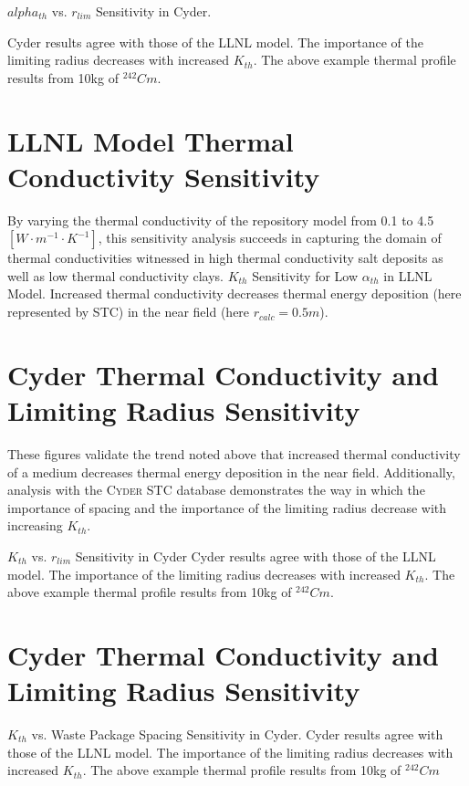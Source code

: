 \documentclass[letterpaper]{article}
\newcommand{\Cyder}{\textsc{Cyder}\xspace}
\begin{document}
  $alpha_{th}$ vs. $r_{lim}$ Sensitivity in Cyder.

  Cyder results agree with those of the LLNL model. The importance of the 
  limiting radius decreases with increased $K_{th}$. The above example thermal 
  profile results from 10kg of $^{242}Cm$.

\section*{LLNL Model Thermal Conductivity Sensitivity}
By varying the thermal conductivity of the repository model from 0.1 to 4.5 
$[W\cdot m^{-1} \cdot K^{-1}]$, this sensitivity analysis succeeds in capturing 
the domain of thermal conductivities witnessed in high thermal conductivity 
salt deposits as well as low thermal conductivity clays.
$K_{th}$ Sensitivity for Low $\alpha_{th}$ in LLNL Model.
Increased thermal conductivity decreases thermal energy deposition 
(here represented by STC) in the near field (here $r_{calc} = 0.5m$).

\section*{Cyder Thermal Conductivity and Limiting Radius Sensitivity}

These figures validate the trend noted above that 
increased thermal conductivity of a medium decreases thermal energy deposition 
in the near field. Additionally, analysis with the \Cyder STC database 
demonstrates the way in which the importance of spacing and the importance of 
the limiting radius decrease with increasing $K_{th}$.

$K_{th}$ vs. $r_{lim}$ Sensitivity in Cyder
Cyder results agree with 
those of the LLNL model. The importance of the limiting radius decreases with 
increased $K_{th}$. The above example thermal profile results from 10kg of 
$^{242}Cm$.

\section*{Cyder Thermal Conductivity and Limiting Radius Sensitivity}

$K_{th}$ vs. Waste Package Spacing Sensitivity in Cyder.
Cyder results 
agree with 
those of the LLNL model. The importance of the limiting radius decreases with 
increased $K_{th}$. The above example thermal profile results from 10kg of 
$^{242}Cm$
\end{document}
